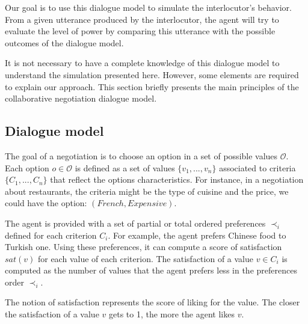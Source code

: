 \documentclass[sigconf]{aamas}  %
\begin{document}
	Our goal is to use this dialogue model to simulate the interlocutor's behavior. From a given utterance produced by the interlocutor, the agent will try to evaluate the level of power by comparing this utterance with the possible outcomes of the dialogue model.
	
	It is not necessary to have a complete knowledge of this dialogue model to understand the simulation presented here. However, some elements are required to explain our approach. This section briefly presents the main principles of the collaborative negotiation dialogue model.
	
	\subsection{Dialogue model}
	\label{sec:dialogue-model}
	
	The goal of a negotiation is to choose an option in a set of possible values $\mathcal{O}$. Each option $o\in\mathcal{O}$ is defined as a set of values $\{v_1, ..., v_n\}$ associated to criteria $\{C_1, ..., C_n\}$ that reflect the options characteristics.  For instance, in a negotiation about restaurants, the criteria might be the type of cuisine and the price, we could have the option: $(French,Expensive)$.
	
	The agent is provided with a set of partial or total ordered preferences $\prec_i$ defined for each criterion $C_i$. For example, the agent prefers Chinese food to Turkish one. Using these preferences, it can compute a score of satisfaction $sat(v)$ for each value of each criterion. The satisfaction of a value $v \in C_i$ is computed as the number of values that the agent prefers less in the preferences order $\prec_i$.
	
%	
	The notion of satisfaction represents the score of liking for the value. The closer the satisfaction of a value $v$ gets to 1, the more the agent likes $v$.
	
\end{document}
